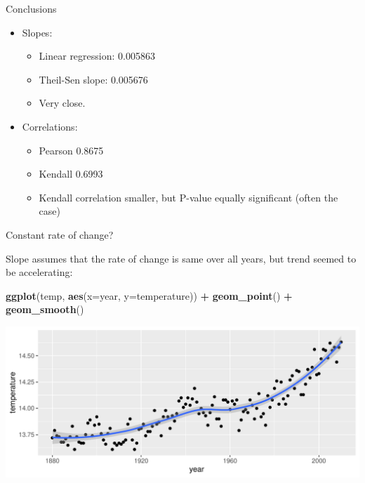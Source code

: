 \documentclass[ignorenonframetext,]{beamer}
\newenvironment{Shaded}{\begin{snugshade}}{\end{snugshade}}
\newcommand{\DataTypeTok}[1]{\textcolor[rgb]{0.13,0.29,0.53}{#1}}
\newcommand{\KeywordTok}[1]{\textcolor[rgb]{0.13,0.29,0.53}{\textbf{#1}}}
\newcommand{\NormalTok}[1]{#1}
\newcommand{\OperatorTok}[1]{\textcolor[rgb]{0.81,0.36,0.00}{\textbf{#1}}}
\newcommand{\StringTok}[1]{\textcolor[rgb]{0.31,0.60,0.02}{#1}}
\providecommand{\tightlist}{%
  \setlength{\itemsep}{0pt}\setlength{\parskip}{0pt}}
\begin{document}
\begin{frame}{Conclusions}
\protect\hypertarget{conclusions-3}{}

\begin{itemize}
\tightlist
\item
  Slopes:

  \begin{itemize}
  \tightlist
  \item
    Linear regression: 0.005863
  \item
    Theil-Sen slope: 0.005676
  \item
    Very close.
  \end{itemize}
\item
  Correlations:

  \begin{itemize}
  \tightlist
  \item
    Pearson 0.8675
  \item
    Kendall 0.6993
  \item
    Kendall correlation smaller, but P-value equally significant (often
    the case)
  \end{itemize}
\end{itemize}

\end{frame}

\begin{frame}[fragile]{Constant rate of change?}
\protect\hypertarget{constant-rate-of-change}{}

Slope assumes that the rate of change is same over all years, but trend
seemed to be accelerating:

\begin{Shaded}
\begin{Highlighting}[]
\KeywordTok{ggplot}\NormalTok{(temp, }\KeywordTok{aes}\NormalTok{(}\DataTypeTok{x=}\NormalTok{year, }\DataTypeTok{y=}\NormalTok{temperature)) }\OperatorTok{+}\StringTok{ }
\StringTok{  }\KeywordTok{geom_point}\NormalTok{() }\OperatorTok{+}\StringTok{ }\KeywordTok{geom_smooth}\NormalTok{()}
\end{Highlighting}
\end{Shaded}

\includegraphics{figure/unnamed-chunk-564-1.pdf}

\end{frame}
\end{document}
